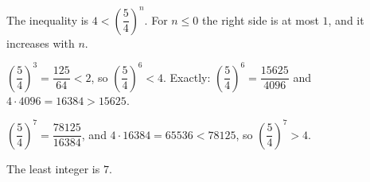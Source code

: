 The inequality is $4<\left(\dfrac54\right)^n$. For $n\le0$ the right side is at most $1$, and it increases with $n$.

$\left(\dfrac54\right)^3=\dfrac{125}{64}<2$, so $\left(\dfrac54\right)^6<4$. Exactly: $\left(\dfrac54\right)^6=\dfrac{15625}{4096}$ and $4\cdot4096=16384>15625$.

$\left(\dfrac54\right)^7=\dfrac{78125}{16384}$, and $4\cdot16384=65536<78125$, so $\left(\dfrac54\right)^7>4$.

The least integer is $\boxed{7}$.

